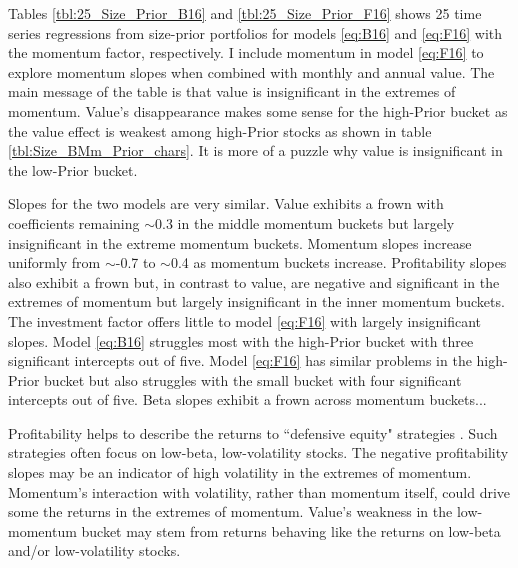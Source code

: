 
Tables \ref{tbl:25_Size_Prior_B16} and \ref{tbl:25_Size_Prior_F16} shows 25
time series regressions from size-prior portfolios for models \ref{eq:B16} and
\ref{eq:F16} with the momentum factor, respectively.
I include momentum in model \ref{eq:F16} to explore momentum slopes when
combined with monthly and annual value.
The main message of the table is that value is insignificant in the extremes of
momentum.
Value's disappearance makes some sense for the high-Prior bucket as the value
effect is weakest among high-Prior stocks as shown in table
\ref{tbl:Size_BMm_Prior_chars}.
It is more of a puzzle why value is insignificant in the low-Prior bucket.

Slopes for the two models are very similar.
Value exhibits a frown with coefficients remaining $\sim$0.3 in the middle
momentum buckets but largely insignificant in the extreme momentum buckets.
Momentum slopes increase uniformly from $\sim$-0.7 to $\sim$0.4 as momentum
buckets increase.
Profitability slopes also exhibit a frown but, in contrast to value, are
negative and significant in the extremes of momentum but largely insignificant
in the inner momentum buckets.
The investment factor offers little to model \ref{eq:F16} with largely
insignificant slopes.
Model \ref{eq:B16} struggles most with the high-Prior bucket with three
significant intercepts out of five.
Model \ref{eq:F16} has similar problems in the high-Prior bucket but also
struggles with the small bucket with four significant intercepts out of five.
Beta slopes exhibit a frown across momentum buckets...

Profitability helps to describe the returns to ``defensive equity" strategies
\parencite{novy2014understanding}.
Such strategies often focus on low-beta, low-volatility stocks.
The negative profitability slopes may be an indicator of high volatility in the
extremes of momentum.
Momentum's interaction with volatility, rather than momentum itself, could
drive some the returns in the extremes of momentum.
Value's weakness in the low-momentum bucket may stem from returns behaving like
the returns on low-beta and/or low-volatility stocks.


